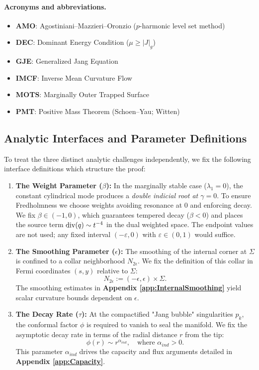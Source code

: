 \paragraph{Acronyms and abbreviations.}
\begin{itemize}
    \item \textbf{AMO}: Agostiniani--Mazzieri--Oronzio ($p$-harmonic level set method)
    \item \textbf{DEC}: Dominant Energy Condition ($\mu \ge |J|_g$)
    \item \textbf{GJE}: Generalized Jang Equation
    \item \textbf{IMCF}: Inverse Mean Curvature Flow
    \item \textbf{MOTS}: Marginally Outer Trapped Surface
    \item \textbf{PMT}: Positive Mass Theorem (Schoen--Yau; Witten)
\end{itemize}

\subsection{Analytic Interfaces and Parameter Definitions}\label{sec:Interface}
To treat the three distinct analytic challenges independently, we fix the following interface definitions which structure the proof:

\begin{enumerate}
    \item \textbf{The Weight Parameter ($\beta$):}
    In the marginally stable case ($\lambda_1=0$), the constant cylindrical mode produces a \emph{double indicial root at $\gamma=0$}. To ensure Fredholmness we choose weights avoiding resonance at $0$ and enforcing decay. We fix \textbf{$\beta \in (-1,0)$}, which guarantees tempered decay ($\beta<0$) and places the source term $\mathrm{div}(q)\sim t^{-4}$ in the dual weighted space. The endpoint values are not used; any fixed interval $(-\varepsilon,0)$ with $\varepsilon\in(0,1)$ would suffice.

    \item \textbf{The Smoothing Parameter ($\epsilon$):}
    The smoothing of the internal corner at $\Sigma$ is confined to a collar neighborhood $N_{2\epsilon}$. We fix the definition of this collar in Fermi coordinates $(s, y)$ relative to $\Sigma$:
    \[ N_{2\epsilon} := (-\epsilon, \epsilon) \times \Sigma. \]
    The smoothing estimates in \textbf{Appendix \ref{app:InternalSmoothing}} yield scalar curvature bounds dependent on $\epsilon$.

    \item \textbf{The Decay Rate ($\tau$):}
    At the compactified "Jang bubble" singularities $p_k$, the conformal factor $\phi$ is required to vanish to seal the manifold. We fix the asymptotic decay rate in terms of the radial distance $r$ from the tip:
    \[ \phi(r) \sim r^{\alpha_{ind}}, \quad \text{where } \alpha_{ind} > 0. \]
    This parameter $\alpha_{ind}$ drives the capacity and flux arguments detailed in \textbf{Appendix \ref{app:Capacity}}.
\end{enumerate}

